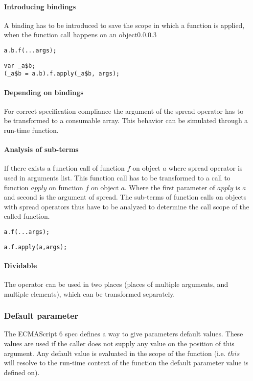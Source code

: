 \documentclass[10pt,a4paper]{article}
\begin{document}
\paragraph{Introducing bindings}
A binding has to be introduced to save the scope in which a function is applied, when the function call happens on an object\ref{spread-analysis-sub-terms}

\begin{lstlisting}
a.b.f(...args);
\end{lstlisting}
\begin{lstlisting}
var _a$b;
(_a$b = a.b).f.apply(_a$b, args);
\end{lstlisting}

\paragraph{Depending on bindings}
For correct specification compliance the argument of the spread operator has to be transformed to a consumable array. This behavior can be simulated through a run-time function.

\paragraph{Analysis of sub-terms} \label{spread-analysis-sub-terms}
If there exists a function call of function $f$ on object $a$ where spread operator is used in arguments list. This function call has to be transformed to a call to function $apply$ on function $f$ on object $a$. Where the first parameter of $apply$ is $a$ and second is the argument of spread. The sub-terms of function calls on objects with spread operators thus have to be analyzed to determine the call scope of the called function.

\begin{lstlisting}
a.f(...args);
\end{lstlisting}
\begin{lstlisting}[caption={apply function with correct $this$ scope}]
a.f.apply(a,args);
\end{lstlisting}

\paragraph{Dividable}
The operator can be used in two places (places of multiple arguments, and multiple elements), which can be transformed separately.

\subsubsection{Default parameter}
The ECMAScript 6 spec defines a way to give parameters default values\cite[9.2.12]{SpecJS}. These values are used if the caller does not supply any value on the position of this argument. Any default value is evaluated in the scope of the function (i.e. $this$ will resolve to the run-time context of the function the default parameter value is defined on).
\end{document}
